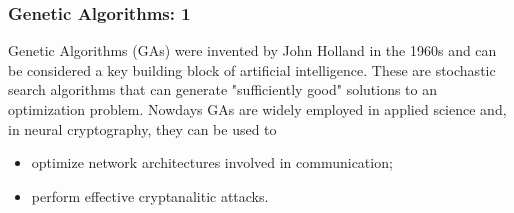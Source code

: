 \documentclass{beamer}
\begin{document}
\begin{frame}
\frametitle{Genetic Algorithms: 1}
Genetic Algorithms (GAs) were invented by John Holland in the 1960s and can
be considered a key building block of artificial intelligence. These are stochastic search algorithms that can generate  
"sufficiently good" solutions to an optimization problem. Nowdays GAs are widely employed
in applied science and, in neural cryptography, they can be used to
\begin{itemize}
\item optimize network architectures involved in communication;
\item perform effective cryptanalitic attacks.
\end{itemize}
\end{frame}

\end{document}
